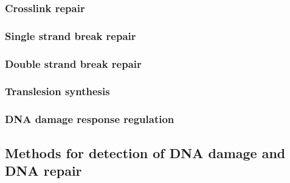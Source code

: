 \subsubsection*{Crosslink repair}

\subsubsection*{Single strand break repair}

\subsubsection*{Double strand break repair}

\subsubsection*{Translesion synthesis}

\subsubsection*{DNA damage response regulation}


\subsection{Methods for detection of DNA damage and DNA repair}

